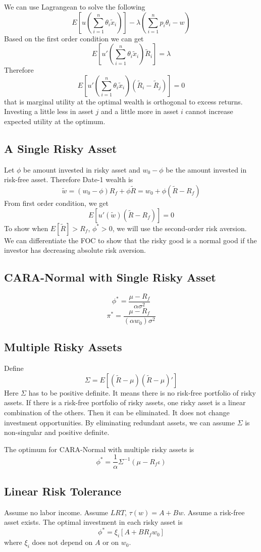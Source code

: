 \documentclass[11pt, a4paper, oneside]{article}
\theoremstyle{definition}
\theoremstyle{proposition}
\theoremstyle{corollary}
\theoremstyle{lemma}
\theoremstyle{theorem}
\begin{document}
We can use Lagrangean to solve the following
$$E\left[u\left(\sum_{i=1}^n\theta_i \tilde{x}_i\right)\right] - \lambda\left(\sum_{i=1}^n p_i\theta_i - w\right)$$
Based on the first order condition we can get
$$E\left[u'\left(\sum_{i=1}^n\theta_i\tilde{x}_i\right)\tilde{R}_i\right]=\lambda$$
Therefore $$E\left[u'\left(\sum_{i=1}^n\theta_i\tilde{x}_i\right)(\tilde{R}_i-\tilde{R}_j)\right]=0$$
that is marginal utility at the optimal wealth is orthogonal to excess returns. Investing a little less in asset $j$ and a little more in asset $i$ cannot increase expected utility at the optimum. 

\subsection{A Single Risky Asset}
Let $\phi$ be amount invested in risky asset and $w_0 - \phi$ be the amount invested in risk-free asset. Therefore Date-1 wealth is
$$\tilde{w} = (w_0 - \phi)R_f + \phi\tilde{R} = w_0 + \phi(\tilde{R}-R_f)$$ 
From first order condition, we get
$$E[u'(\tilde{w})(\tilde{R}-R_f)] =0$$
To show when $E[\tilde{R}]>R_f$, $\phi^* > 0$, we will use the second-order risk aversion. We can differentiate the FOC to show that the risky good is a normal good if the investor has decreasing absolute risk aversion. 

\subsection{CARA-Normal with Single Risky Asset}
$$\phi^* = \frac{\mu - R_f}{\alpha \sigma^2}$$
$$\pi^* = \frac{\mu -R_f}{(\alpha w_0)\sigma^2}$$ 

\subsection{Multiple Risky Assets}
Define $$\Sigma = E[(\tilde{R}- \mu)(\tilde{R}- \mu)']$$
Here $\Sigma$ has to be positive definite. It means there is no risk-free portfolio of risky assets. If there is a risk-free portfolio of risky assets, one risky asset is a linear combination of the others. Then it can be eliminated. It does not change investment opportunities. By eliminating redundant assets, we can assume $\Sigma$ is non-singular and positive definite.  

The optimum for CARA-Normal with multiple risky assets is
$$\phi^* = \frac{1}{\alpha}\Sigma^{-1}(\mu-R_f\iota)$$

\subsection{Linear Risk Tolerance}
Assume no labor income. Assume $LRT$, $\tau(w) = A+Bw$. Assume a risk-free asset exists. The optimal investment in each risky asset is $$\phi^* = \xi_i[A+BR_fw_0]$$
where $\xi_i$ does not depend on $A$ or on $w_0$. 
\end{document}

